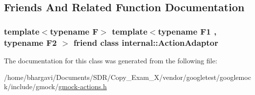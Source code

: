 \subsection{Friends And Related Function Documentation}
\subsubsection[{\texorpdfstring{internal\+::\+Action\+Adaptor}{internal::ActionAdaptor}}]{\setlength{\rightskip}{0pt plus 5cm}template$<$typename F$>$ template$<$typename F1 , typename F2 $>$ friend class {\bf internal\+::\+Action\+Adaptor}\hspace{0.3cm}{\ttfamily [friend]}}\hypertarget{classtesting_1_1_action_a66fe4f9c9b9d020273151aa6054b491e}{}\label{classtesting_1_1_action_a66fe4f9c9b9d020273151aa6054b491e}


The documentation for this class was generated from the following file\+:\begin{DoxyCompactItemize}
\item 
/home/bhargavi/\+Documents/\+S\+D\+R/\+Copy\+\_\+\+Exam\+\_\+X/vendor/googletest/googlemock/include/gmock/\hyperlink{gmock-actions_8h}{gmock-\/actions.\+h}\end{DoxyCompactItemize}
